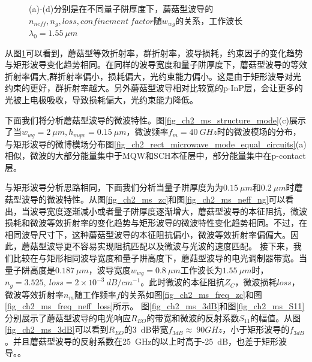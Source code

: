 \begin{figure}[htb]
{\begin{minipage}[]{0.5\textwidth}
		\end{minipage}}
\caption{(a)-(d)分别是在不同量子阱厚度下，蘑菇型波导的$n_{neff}, n_g, loss, confinement~factor$随$w_{wg}$的关系，工作波长$\lambda_0 = 1.55~\mu m$}
\label{fig_ch2_ms_property}
\end{figure}


从图\ref{fig_ch2_ms_property}可以看到，蘑菇型等效折射率，群折射率，波导损耗，约束因子的变化趋势与矩形波导变化趋势相同。在同样的波导宽度和量子阱厚度下，蘑菇型波导的等效折射率偏大,群折射率偏小，损耗偏大，光约束能力偏小。这是由于矩形波导对光约束的更好，群折射率越大。另外蘑菇型波导相对比较宽的p-InP层，会让更多的光被上电极吸收，导致损耗偏大，光约束能力降低。

下面我们将分析蘑菇型波导的微波特性。图\ref{fig_ch2_ms_structure_mode}(c)展示了当$w_{wg} =2~\mu m, h_{mqw} = 0.15~ \mu m$，微波频率$f_m =40~ GHz$时的微波模场的分布，与矩形波导的微博模场分布图\ref{fig_ch2_rect_microwave_mode_equal_circuits}(a)相似，微波的大部分能量集中于MQW和SCH本征层中，部分能量集中在p-contact层。

与矩形波导分析思路相同，下面我们分析当量子阱厚度为为$0.15~ \mu m$和$0.2 ~\mu m$时蘑菇型波导的微波特性。从图\ref{fig_ch2_ms_zc}和图\ref{fig_ch2_ms_neff_ng}可以看出，当波导宽度逐渐减小或者量子阱厚度逐渐增大，蘑菇型波导的本征阻抗，微波损耗和微波等效折射率的变化趋势与矩形波导的微波特性变化趋势相同。不过，在相同波导尺寸下，这种蘑菇型波导的本征阻抗偏小，微波等效折射率偏偏大。因此，蘑菇型波导更不容易实现阻抗匹配以及微波与光波的速度匹配。
接下来，我们比较在与矩形相同波导宽度和量子阱高度下，蘑菇型波导的电光调制器带宽。当量子阱高度是$0.187~ \mu m$，波导宽度$w_{wg} = 0.8~ \mu m$工作波长为$1.55~ \mu m$时，$n_g = 3.525,~loss =  2\times 10^{-3} ~dB/cm^{-1} $。此时微波的本征阻抗$Z_C$，微波损耗$loss$，微波等效折射率$n_m$随工作频率$f$的关系如图\ref{fig_ch2_ms_freq_zc}和图\ref{fig_ch2_ms_freq_neff_loss}所示。
图\ref{fig_ch2_ms_3dB}和图\ref{fig_ch2_ms_S11}分别展示了蘑菇型波导的电光响应$R_{EO}$的带宽和微波的反射系数$S_{11}$的幅值。从图\ref{fig_ch2_ms_3dB}可以看到$R_{EO}$的3~dB带宽$f_{3dB}\approx ~90 GHz$，小于矩形波导的$f_{3dB}$。并且蘑菇型波导的反射系数在25~GHz的以上时高于-25~dB，也差于矩形波导。\cite{tang2012over}。


